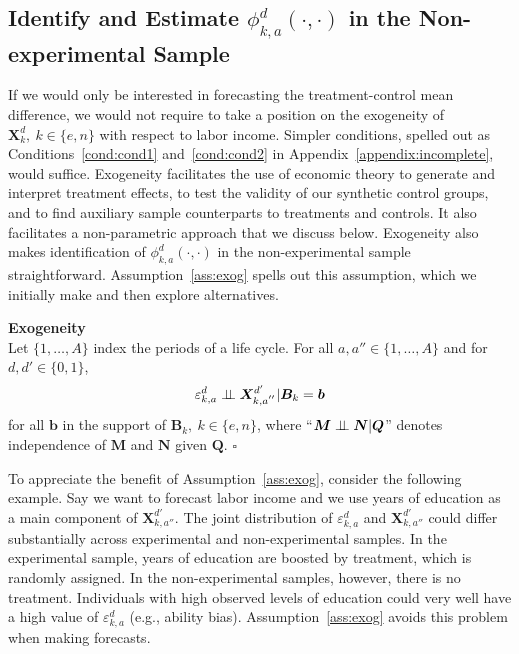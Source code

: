 \subsection{Identify and Estimate $\phi^d_{k,a}\left( \cdot, \cdot \right)$ in the Non-experimental Sample}

If we would only be interested in forecasting the treatment-control mean difference, we would not require to take a position on the exogeneity of $\bm{X}^d_k, \: k \in \{e,n\}$ with respect to labor income. Simpler conditions, spelled out as Conditions~\ref{cond:cond1} and~\ref{cond:cond2} in Appendix~\ref{appendix:incomplete}, would suffice. Exogeneity facilitates the use of economic theory to generate and interpret treatment effects, to test the validity of our synthetic control groups, and to find auxiliary sample counterparts to treatments and controls. It also facilitates a non-parametric approach that we discuss below. Exogeneity also makes identification of $\phi^d_{k,a}\left( \cdot, \cdot \right)$ in the non-experimental sample straightforward. Assumption~\ref{ass:exog} spells out this assumption, which we initially make and then explore alternatives.

\begin{assumption}\label{ass:exog} \textbf{Exogeneity}\\
Let $\{ 1, \ldots, A \}$ index the periods of a life cycle. For all $a, a'' \in \{ 1, \ldots, A \}$ and for $d, d' \in \{0,1\}$,
\begin{equation}
\varepsilon^d_{k,a} \perp\!\!\!\perp \bm{X}^{d^{\prime}}_{k,a^{''}} | \bm{B}_k = \bm{b}
\end{equation}
for all $\bm{b}$ in the support of $\bm{B}_k, \: k \in \{e,n\}$, where ``$\bm{M} \perp\!\!\!\perp \bm{N}|\bm{Q}$'' denotes independence of $\bm{M}$ and $\bm{N}$ given $\bm{Q}$. $\square$
\end{assumption}

\noindent To appreciate the benefit of Assumption~\ref{ass:exog}, consider the following example. Say we want to forecast labor income and we use years of education as a main component of $\bm{X}_{k,{a''}}^{d'}$. The joint distribution of $\varepsilon_{k,a}^d$ and $\bm{X}_{k,{a''}}^{d'}$ could differ substantially across experimental and non-experimental samples. In the experimental sample, years of education are boosted by treatment, which is randomly assigned. In the non-experimental samples, however, there is no treatment. Individuals with high observed levels of education could very well have a high value of  $\varepsilon_{k,a}^d$ (e.g., ability bias). Assumption~\ref{ass:exog} avoids this problem when making forecasts.\\

